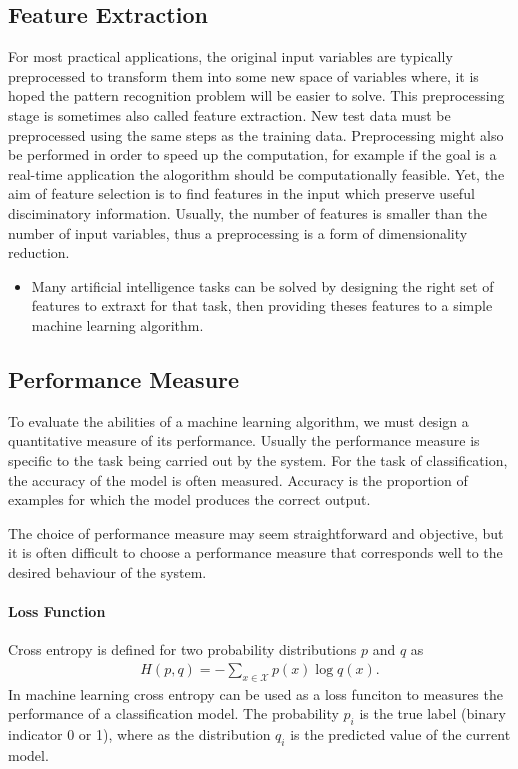 \documentclass{scrartcl}
\begin{document}
\subsection{Feature Extraction}

For most practical applications, the original input variables are typically preprocessed to transform them into some new space of variables where, it is hoped the pattern recognition problem will be easier to solve. This preprocessing stage is sometimes also called feature extraction. New test data must be preprocessed using the same steps as the training data. Preprocessing might also be performed in order to speed up the computation, for example if the goal is a real-time application the alogorithm should be computationally feasible. Yet, the aim of feature selection is to find features in the input which preserve useful disciminatory information. Usually, the number of features is smaller than the number of input variables, thus a preprocessing is a form of dimensionality reduction. 


\begin{itemize}
\item Many artificial intelligence tasks can be solved by designing the right set of features to extraxt for that task, then providing theses features to a simple machine learning algorithm. \cite{Goodfellow2016}
\end{itemize}


\subsection{Performance Measure}

To evaluate the abilities of a machine learning algorithm, we must design a quantitative measure of its performance. Usually the performance measure is specific to the task being carried out by the system. For the task of classification, the accuracy of the model is often measured. Accuracy is the proportion of examples for which the model produces the correct output. 

The choice of performance measure may seem straightforward and objective, but it is often difficult to choose a performance measure that corresponds well to the desired behaviour of the system. 

\paragraph{Loss Function}
Cross entropy is defined for two probability distributions $p$ and $q$ as
\begin{align}
H(p,q) = - \sum_{x \in \mathcal X} p(x) \log q(x).
\end{align} 
In machine learning cross entropy can be used as a loss funciton to measures the performance of a classification model. The probability $p_{i}$ is the true label (binary indicator 0 or 1), where as the distribution $q_{i}$ is the predicted value of the current model. 
\end{document}
